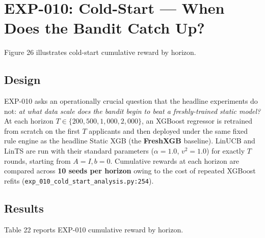 \section{EXP-010: Cold-Start --- When Does the Bandit Catch Up?}\label{exp-010-cold-start-when-does-the-bandit-catch-up}

Figure 26 illustrates cold-start cumulative reward by horizon.


\subsection{Design}\label{design-3}

EXP-010 asks an operationally crucial question that the headline experiments do not: \emph{at what data scale does the bandit begin to beat a freshly-trained static model?} At each horizon \(T \in \{200, 500, 1{,}000, 2{,}000\}\), an XGBoost regressor is retrained from scratch on the first \(T\) applicants and then deployed under the same fixed rule engine as the headline Static XGB (the \textbf{FreshXGB} baseline). LinUCB and LinTS are run with their standard parameters (\(\alpha = 1.0\), \(v^2 = 1.0\)) for exactly \(T\) rounds, starting from \(A = I, b = 0\). Cumulative rewards at each horizon are compared across \textbf{10 seeds per horizon} owing to the cost of repeated XGBoost refits (\texttt{exp\_010\_cold\_start\_analysis.py:254}).

\subsection{Results}\label{results-4}

Table 22 reports EXP-010 cumulative reward by horizon.

\label{tab:5.10.1}

